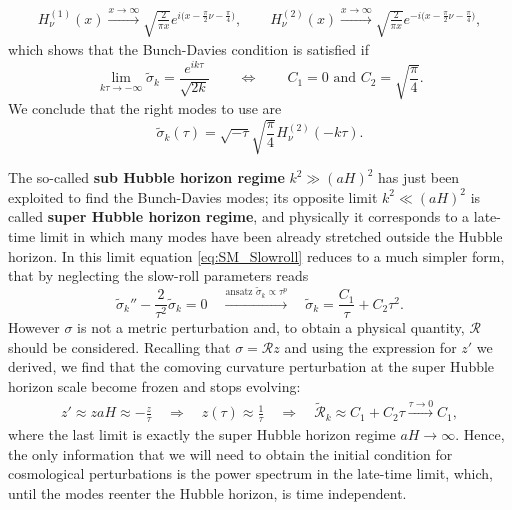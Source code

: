 \begin{align*}
    H_\nu^{(1)}(x)\xrightarrow{x\to\infty}\sqrt{\frac{2}{\pi x} }e^{i\big(x-\frac{\pi}{2}\nu-\frac{\pi}{4}\big)},\qquad H^{(2)}_\nu(x)\xrightarrow{x\to\infty}\sqrt{\frac{2}{\pi x} }e^{-i\big(x-\frac{\pi}{2}\nu-\frac{\pi}{4}\big)},
\end{align*}
which shows that the Bunch-Davies condition is satisfied if 
$$\lim_{k\tau\to -\infty}\tilde\sigma_k=\frac{e^{ik\tau}}{\sqrt{2k}}\qquad\Longleftrightarrow\qquad C_1=0\text{ and }C_2= \sqrt{\frac{\pi}{4}}.$$
We conclude that the right modes to use are 
\begin{equation}
    \tilde\sigma_k(\tau)=\sqrt{-\tau}\sqrt{\frac{\pi}{4}}H_\nu^{(2)}(-k\tau).\label{eq:sigma_BD_mode}
\end{equation}

The so-called \textbf{sub Hubble horizon regime} $k^2\gg(aH)^2$ has just been exploited to find the Bunch-Davies modes; its opposite limit $k^2\ll(aH)^2$ is called \textbf{super Hubble horizon regime}, and physically it corresponds to a late-time limit in which many modes have been already stretched outside the Hubble horizon. In this limit equation \eqref{eq:SM_Slowroll} reduces to a much simpler form, that by neglecting the slow-roll parameters reads
$$ \tilde\sigma_k''-\frac{2}{\tau^2}\tilde\sigma_k=0\quad\xrightarrow{\text{ansatz }\tilde\sigma_k\propto \tau^p}\quad\tilde\sigma_k=\frac{C_1}{\tau}+C_2\tau^2.$$
However $\sigma$ is not a metric perturbation and, to obtain a physical quantity, $\mathcal{R}$ should be considered. Recalling that $\sigma=\mathcal{R}z$ and using the expression for $z'$ we derived, we find that the comoving curvature perturbation at the super Hubble horizon scale become frozen and stops evolving:
\begin{align*}
    z'\approx zaH\approx-\frac{z}{\tau}\quad\Rightarrow\quad z(\tau)\approx\frac{1}{\tau}\quad\Rightarrow\quad\tilde{\mathcal{R}}_k\approx C_1+C_2\tau\xrightarrow{\tau\to 0}C_1,
\end{align*}
where the last limit is exactly the super Hubble horizon regime $aH\to\infty$. Hence, the only information that we will need to obtain the initial condition for cosmological perturbations is the power spectrum in the late-time limit, which, until the modes reenter the Hubble horizon, is time independent.

